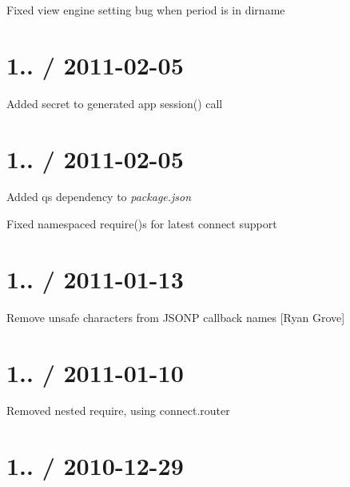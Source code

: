 \begin{DoxyItemize}
\item Fixed {\ttfamily view engine} setting bug when period is in dirname
\end{DoxyItemize}

\section*{1.. / 2011-\/02-\/05 }


\begin{DoxyItemize}
\item Added secret to generated app {\ttfamily session()} call
\end{DoxyItemize}

\section*{1.. / 2011-\/02-\/05 }


\begin{DoxyItemize}
\item Added {\ttfamily qs} dependency to {\itshape package.\+json}
\item Fixed namespaced {\ttfamily require()}s for latest connect support
\end{DoxyItemize}

\section*{1.. / 2011-\/01-\/13 }


\begin{DoxyItemize}
\item Remove unsafe characters from J\+S\+O\+N\+P callback names \mbox{[}Ryan Grove\mbox{]}
\end{DoxyItemize}

\section*{1.. / 2011-\/01-\/10 }


\begin{DoxyItemize}
\item Removed nested require, using {\ttfamily connect.\+router}
\end{DoxyItemize}

\section*{1.. / 2010-\/12-\/29 }


